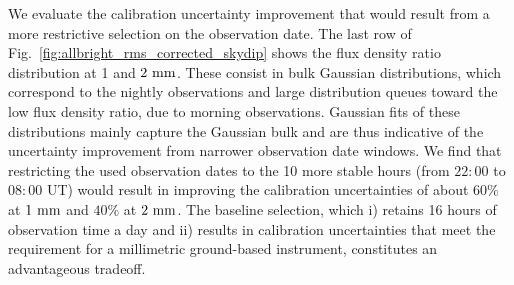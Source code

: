 We evaluate the calibration
uncertainty improvement that would result from a more restrictive
selection on the observation date. The last row of
Fig.~\ref{fig:allbright_rms_corrected_skydip} shows the flux density
ratio distribution at 1 and $2~\rm{mm}$. These consist in bulk Gaussian
distributions, which correspond to the nightly observations and large
distribution queues toward the low flux density ratio, due to morning
observations. Gaussian fits of these distributions mainly capture the
Gaussian bulk and are thus indicative of the uncertainty improvement
from narrower observation date windows. We find that restricting the
used observation dates to the 10 more stable hours (from $22:00$ to
$08:00$ UT) would result in improving the calibration uncertainties of
about $60\%$ at $1~\rm{mm}$ and $40\%$ at $2~\rm{mm}$. The baseline
selection, which i) retains 16 hours of observation time a day and ii)
results in calibration uncertainties that meet the requirement for a
millimetric ground-based instrument, constitutes an advantageous
tradeoff.  




